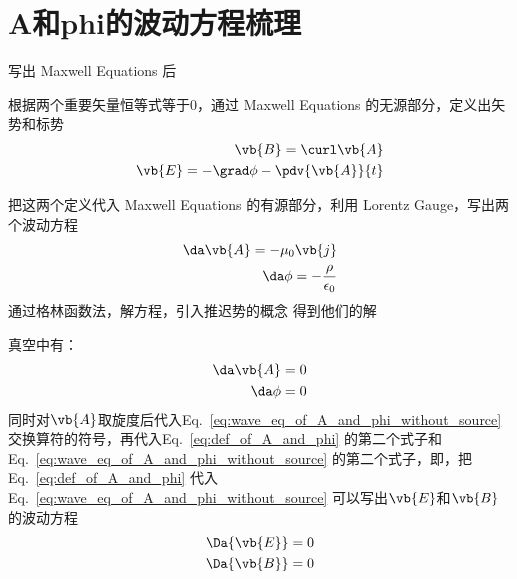 
\section{A和phi的波动方程梳理}

写出 Maxwell Equations 后

根据两个重要矢量恒等式等于0，通过 Maxwell Equations 的无源部分，定义出矢势和标势
\begin{equation}
	\begin{aligned}
	\vb{B} = \curl \vb{A} \\
	\vb{E} =  - \grad \phi - \pdv{\vb{A}}{t}
	\label{eq:def_of_A_and_phi}
	\end{aligned}
\end{equation}

把这两个定义代入 Maxwell Equations 的有源部分，利用 Lorentz Gauge，写出两个波动方程
\begin{equation}
	\begin{aligned}
		\da \vb{A} = - \mu_{0}  \vb{j} \\
	\da \phi = - \frac{\rho}{\epsilon_0}
	\label{eq:wave_eq_of_A_and_phi}
	\end{aligned}
\end{equation}
通过格林函数法，解方程，引入推迟势的概念
得到他们的解

真空中有：
\begin{equation}
	\begin{aligned}
		\da \vb{A} = 0 \\
	\da \phi =0
	\label{eq:wave_eq_of_A_and_phi_without_source}
	\end{aligned}
\end{equation}
同时对\(\vb{A}\)取旋度后代入Eq.~\eqref{eq:wave_eq_of_A_and_phi_without_source}交换算符的符号，再代入Eq.~\eqref{eq:def_of_A_and_phi} 的第二个式子和Eq.~\eqref{eq:wave_eq_of_A_and_phi_without_source} 的第二个式子，即，把Eq.~\eqref{eq:def_of_A_and_phi} 代入Eq.~\eqref{eq:wave_eq_of_A_and_phi_without_source} 
可以写出\(\vb{E}\)和\(\vb{B}\)的波动方程
\begin{equation}
	\begin{aligned}
		\Da{\vb{E}} = 0 \\
		\Da{\vb{B}} = 0
	\end{aligned}
\end{equation}





